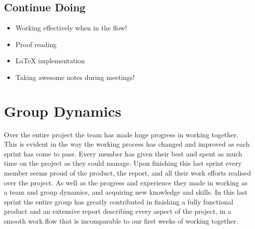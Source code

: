 \subsection{Continue Doing}
\begin{itemize}
\item Working effectively when in the flow! 
\item Proof reading
\item LaTeX implementation
\item Taking awesome notes during meetings! 
\end{itemize}

\section{Group Dynamics}
\label{sec:FinalDynamics}
Over the entire project the team has made huge progress in working together. This is evident in the way the working process has changed and improved as each sprint has come to pass. Every member has given their best and spent as much time on the project as they could manage. Upon finishing this last sprint every member seems proud of the product, the report, and all their work efforts realised over the project. As well as the progress and experience they made in working as a team and group dynamics, and acquiring new knowledge and skills. In this last sprint the entire group has greatly contributed in finishing a fully functional product and an extensive report describing every aspect of the project, in a smooth work flow that is incomparable to our first weeks of working together. 